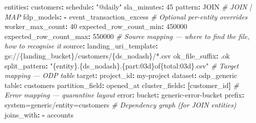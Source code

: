 \documentclass[
  11pt,
  british,
  oneside]{book}
\newenvironment{Shaded}{\begin{snugshade}}{\end{snugshade}}
\newcommand{\AttributeTok}[1]{\textcolor[rgb]{0.77,0.63,0.00}{#1}}
\newcommand{\CommentTok}[1]{\textcolor[rgb]{0.56,0.35,0.01}{\textit{#1}}}
\newcommand{\DecValTok}[1]{\textcolor[rgb]{0.00,0.00,0.81}{#1}}
\newcommand{\FunctionTok}[1]{\textcolor[rgb]{0.00,0.00,0.00}{#1}}
\newcommand{\KeywordTok}[1]{\textcolor[rgb]{0.13,0.29,0.53}{\textbf{#1}}}
\newcommand{\StringTok}[1]{\textcolor[rgb]{0.31,0.60,0.02}{#1}}
\begin{document}
\begin{Shaded}
\begin{Highlighting}[]
\FunctionTok{entities}\KeywordTok{:}
\AttributeTok{  }\FunctionTok{customers}\KeywordTok{:}
\AttributeTok{    }\FunctionTok{schedule}\KeywordTok{:}\AttributeTok{ }\StringTok{"@daily"}
\AttributeTok{    }\FunctionTok{sla\_minutes}\KeywordTok{:}\AttributeTok{ }\DecValTok{45}
\AttributeTok{    }\FunctionTok{pattern}\KeywordTok{:}\AttributeTok{ JOIN}\CommentTok{                  \# JOIN | MAP}
\AttributeTok{    }\FunctionTok{fdp\_models}\KeywordTok{:}
\AttributeTok{      }\KeywordTok{{-}}\AttributeTok{ event\_transaction\_excess}
\CommentTok{    \# Optional per{-}entity overrides}
\AttributeTok{    }\FunctionTok{worker\_max\_count}\KeywordTok{:}\AttributeTok{ }\DecValTok{40}
\AttributeTok{    }\FunctionTok{expected\_row\_count\_min}\KeywordTok{:}\AttributeTok{ }\DecValTok{450000}
\AttributeTok{    }\FunctionTok{expected\_row\_count\_max}\KeywordTok{:}\AttributeTok{ }\DecValTok{550000}
\CommentTok{    \# Source mapping — where to find the file, how to recognise it}
\AttributeTok{    }\FunctionTok{source}\KeywordTok{:}
\AttributeTok{      }\FunctionTok{landing\_uri\_template}\KeywordTok{:}\AttributeTok{ gs://\{landing\_bucket\}/customers/\{ds\_nodash\}/*.csv}
\AttributeTok{      }\FunctionTok{ok\_file\_suffix}\KeywordTok{:}\AttributeTok{ .ok}
\AttributeTok{      }\FunctionTok{split\_pattern}\KeywordTok{:}\AttributeTok{ }\StringTok{"\{entity\}.\{ds\_nodash\}.\{part:03d\}of\{total:03d\}.csv"}
\CommentTok{    \# Target mapping — ODP table}
\AttributeTok{    }\FunctionTok{target}\KeywordTok{:}
\AttributeTok{      }\FunctionTok{project\_id}\KeywordTok{:}\AttributeTok{ my{-}project}
\AttributeTok{      }\FunctionTok{dataset}\KeywordTok{:}\AttributeTok{ odp\_generic}
\AttributeTok{      }\FunctionTok{table}\KeywordTok{:}\AttributeTok{ customers}
\AttributeTok{      }\FunctionTok{partition\_field}\KeywordTok{:}\AttributeTok{ opened\_at}
\AttributeTok{      }\FunctionTok{cluster\_fields}\KeywordTok{:}\AttributeTok{ }\KeywordTok{[}\AttributeTok{customer\_id}\KeywordTok{]}
\CommentTok{    \# Error mapping — quarantine layout}
\AttributeTok{    }\FunctionTok{error}\KeywordTok{:}
\AttributeTok{      }\FunctionTok{bucket}\KeywordTok{:}\AttributeTok{ generic{-}error{-}bucket}
\AttributeTok{      }\FunctionTok{prefix}\KeywordTok{:}\AttributeTok{ system=generic/entity=customers}
\CommentTok{    \# Dependency graph (for JOIN entities)}
\AttributeTok{    }\FunctionTok{joins\_with}\KeywordTok{:}
\AttributeTok{      }\KeywordTok{{-}}\AttributeTok{ accounts}


\end{Highlighting}
\end{Shaded}
\end{document}
